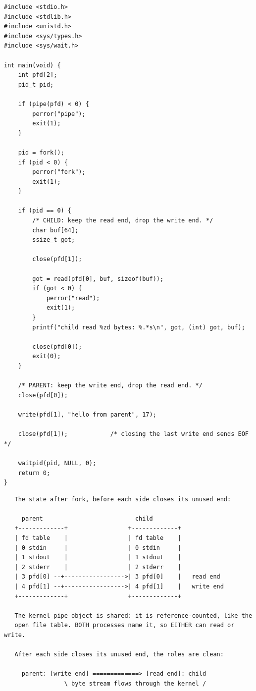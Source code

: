 \begin{lstlisting}[caption={Parent writes, child reads: the canonical IPC dance.}]
#include <stdio.h>
#include <stdlib.h>
#include <unistd.h>
#include <sys/types.h>
#include <sys/wait.h>

int main(void) {
    int pfd[2];
    pid_t pid;

    if (pipe(pfd) < 0) {
        perror("pipe");
        exit(1);
    }

    pid = fork();
    if (pid < 0) {
        perror("fork");
        exit(1);
    }

    if (pid == 0) {
        /* CHILD: keep the read end, drop the write end. */
        char buf[64];
        ssize_t got;

        close(pfd[1]);

        got = read(pfd[0], buf, sizeof(buf));
        if (got < 0) {
            perror("read");
            exit(1);
        }
        printf("child read %zd bytes: %.*s\n", got, (int) got, buf);

        close(pfd[0]);
        exit(0);
    }

    /* PARENT: keep the write end, drop the read end. */
    close(pfd[0]);

    write(pfd[1], "hello from parent", 17);

    close(pfd[1]);            /* closing the last write end sends EOF */

    waitpid(pid, NULL, 0);
    return 0;
}
\end{lstlisting}

\begin{verbatim}
   The state after fork, before each side closes its unused end:

     parent                          child
   +-------------+                 +-------------+
   | fd table    |                 | fd table    |
   | 0 stdin     |                 | 0 stdin     |
   | 1 stdout    |                 | 1 stdout    |
   | 2 stderr    |                 | 2 stderr    |
   | 3 pfd[0] --+----------------->| 3 pfd[0]    |   read end
   | 4 pfd[1] --+----------------->| 4 pfd[1]    |   write end
   +-------------+                 +-------------+

   The kernel pipe object is shared: it is reference-counted, like the
   open file table. BOTH processes name it, so EITHER can read or write.

   After each side closes its unused end, the roles are clean:

     parent: [write end] =============> [read end]: child
                 \ byte stream flows through the kernel /
\end{verbatim}

